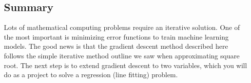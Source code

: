 \documentclass[titlepage]{tufte-book}
\newcounter{problem}
\begin{document}
\begin{fullwidth}
\section{Summary}

Lots of mathematical computing problems require an iterative solution. One of the most important is minimizing error functions to train machine learning models. The good news is that the gradient descent method described here follows the simple iterative method outline we saw when approximating square root. The next step is to extend gradient descent to two variables, which you will do as a project to solve a regression (line fitting) problem.

\end{fullwidth}
\end{document}
